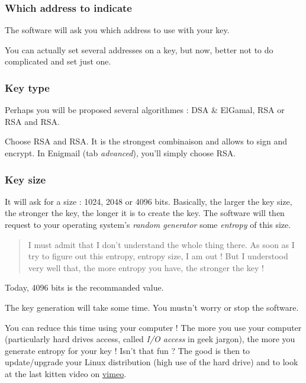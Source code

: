 \subsubsection{Which address to indicate}\label{which-address-to-indicate}

The software will ask you which address to use with your key.

You can actually set several addresses on a key, but now, better not to
do complicated and set just one.

\subsubsection{Key type}\label{key-type}

Perhaps you will be proposed several algorithmes : DSA \& ElGamal, RSA
or RSA and RSA.

Choose RSA and RSA. It is the strongest combinaison and allows to sign
and encrypt. In Enigmail (tab \emph{advanced}), you'll simply choose
RSA.

\subsubsection{Key size}\label{key-size}

It will ask for a size : 1024, 2048 or 4096 bits. Basically, the larger
the key size, the stronger the key, the longer it is to create the key.
The software will then request to your operating system's \emph{random
generator} some \emph{entropy} of this size.

\begin{quote}
I must admit that I don't understand the whole thing there. As soon as I
try to figure out this entropy, entropy size, I am out ! But I
understood very well that, the more entropy you have, the stronger the
key !
\end{quote}

Today, 4096 bits is the recommanded value.

The key generation will take some time. You mustn't worry or stop the
software.

You can reduce this time using your computer ! The more you use your
computer (particularly hard drives access, called \emph{I/O access} in
geek jargon), the more you generate entropy for your key ! Isn't that
fun ? The good is then to update/upgrade your Linux distribution (high
use of the hard drive) and to look at the last kitten video on
\href{https://vimeo.com/tag:cat}{vimeo}.


